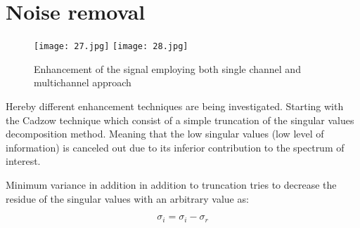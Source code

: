\section{Noise removal}


\begin{figure}[!htbp]
%
\centering
\texttt{[image: 27.jpg]}
\endminipage\hfill
{}%
\centering
\texttt{[image: 28.jpg]}
\endminipage\hfill
\caption{Enhancement of the signal employing both single channel and multichannel approach}
\end{figure}

Hereby different enhancement techniques are being investigated. Starting with the Cadzow technique which consist of a simple truncation of the singular values decomposition method. Meaning that the low singular values (low level of information) is canceled out due to its inferior contribution to the spectrum of interest.

Minimum variance in addition in addition to truncation tries to decrease the residue of the singular values with an arbitrary value as:

\begin{equation}
\sigma_{i}=\sigma_{i}-\sigma_{r}
\end{equation}


